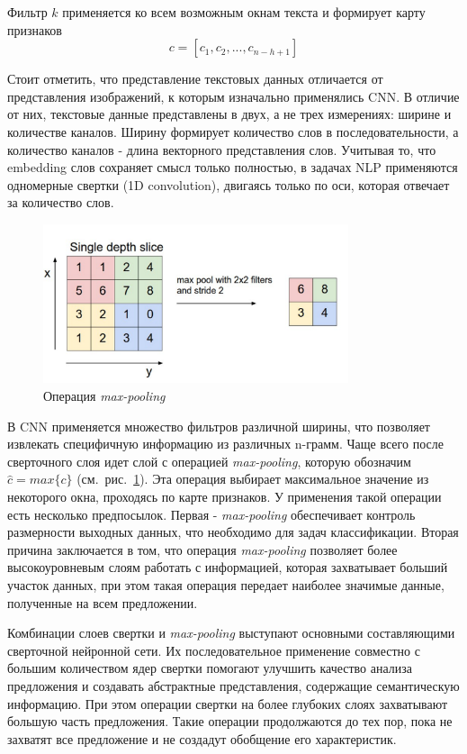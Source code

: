  Фильтр $k$ применяется ко всем возможным окнам текста и формирует карту признаков
\begin{equation}
c = [c_1, c_2, ... , c_{n-h+1}]
\end{equation} 

Стоит отметить, что представление текстовых данных отличается от представления изображений, к которым изначально применялись CNN. В отличие от них, текстовые данные представлены в двух, а не трех измерениях: ширине и количестве каналов. Ширину формирует количество слов в последовательности, а количество каналов - длина векторного представления слов. Учитывая то, что embedding слов сохраняет смысл только полностью, в задачах NLP применяются одномерные свертки (1D convolution), двигаясь только по оси, которая отвечает за количество слов.

\begin{figure}[t]
\centering
\includegraphics[width=0.8\textwidth]{img/maxpool}
\caption{\label{fig:maxpool}Операция \emph{max-pooling}}
\end{figure}

В CNN применяется множество фильтров различной ширины, что позволяет извлекать специфичную информацию из различных n-грамм. Чаще всего после сверточного слоя идет слой с операцией \emph{max-pooling}, которую обозначим $\hat{c} = max\{c\}$ (см.~рис.~\ref{fig:maxpool}). Эта операция выбирает максимальное значение из некоторого окна, проходясь по карте признаков. У применения такой операции есть несколько предпосылок.
Первая  -  \emph{max-pooling} обеспечивает контроль размерности выходных данных, что необходимо для задач классификации. Вторая причина заключается в том, что операция  \emph{max-pooling} позволяет более высокоуровневым слоям работать с информацией, которая захватывает больший участок данных, при этом такая операция передает наиболее значимые данные, полученные на всем предложении. 

Комбинации слоев свертки и \emph{max-pooling} выступают основными составляющими сверточной нейронной сети. Их последовательное применение совместно с большим количеством ядер свертки помогают улучшить качество анализа предложения и создавать абстрактные представления, содержащие семантическую информацию. При этом операции свертки на более глубоких слоях захватывают большую часть предложения. Такие операции продолжаются до тех пор, пока не захватят все предложение и не создадут обобщение его характеристик.


